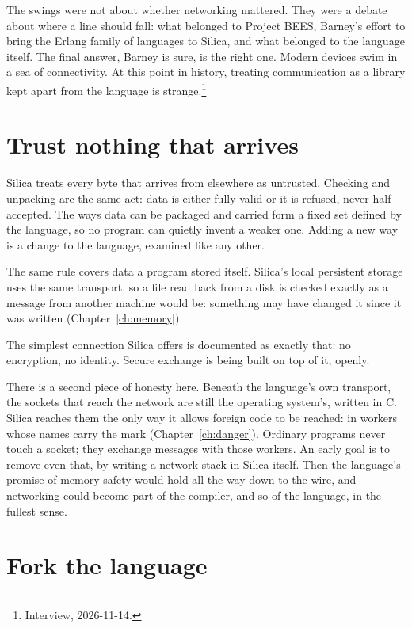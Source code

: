 The swings were not about whether networking mattered. They were a debate
about where a line should fall: what belonged to Project BEES, Barney's effort to
bring the Erlang family of languages to Silica, and what belonged to the language
itself. The final answer, Barney is sure, is the right one. Modern devices swim
in a sea of connectivity. At this point in history, treating communication as a
library kept apart from the language is strange.\footnote{Interview,
2026-11-14.}

\section{Trust nothing that arrives}

Silica treats every byte that arrives from elsewhere as untrusted. Checking and
unpacking are the same act: data is either fully valid or it is refused, never
half-accepted. The ways data can be packaged and carried form a fixed set
defined by the language, so no program can quietly invent a weaker one. Adding
a new way is a change to the language, examined like any other.

The same rule covers data a program stored itself. Silica's local persistent
storage uses the same transport, so a file read back from a disk is checked
exactly as a message from another machine would be: something may have changed
it since it was written (Chapter~\ref{ch:memory}).

The simplest connection Silica offers is documented as exactly that: no
encryption, no identity. Secure exchange is being built on top of it, openly.

There is a second piece of honesty here. Beneath the language's own transport,
the sockets that reach the network are still the operating system's, written
in C. Silica reaches them the only way it allows foreign code to be reached: in
workers whose names carry the  mark (Chapter~\ref{ch:danger}).
Ordinary programs never touch a socket; they exchange messages with those
workers. An early goal is to remove even that, by writing a network stack in
Silica itself. Then the language's promise of memory safety would hold all the
way down to the wire, and networking could become part of the compiler, and so
of the language, in the fullest sense.

\section{Fork the language}

